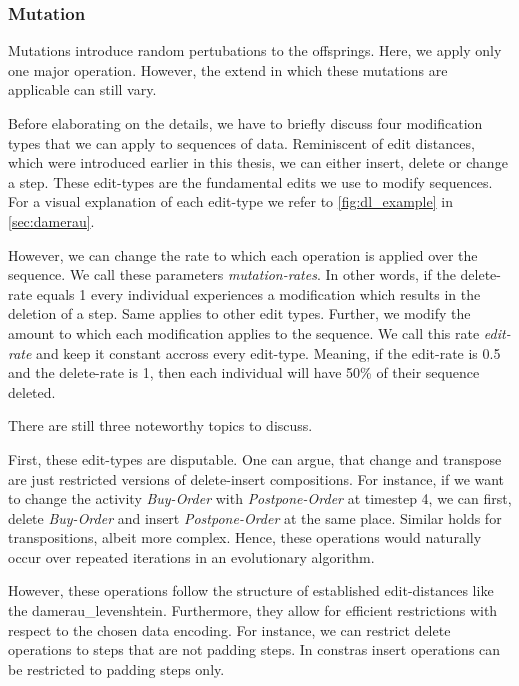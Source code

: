 \documentclass[./../../paper.tex]{subfiles}
\begin{document}

\subsubsection{Mutation}
Mutations introduce random pertubations to the offsprings. Here, we apply only one major operation. However, the extend in which these mutations are applicable can still vary.

Before elaborating on the details, we have to briefly discuss four modification types that we can apply to sequences of data. Reminiscent of edit distances, which were introduced earlier in this thesis, we can either insert, delete or change a step. These edit-types are the fundamental edits we use to modify sequences. For a visual explanation of each edit-type we refer to \autoref{fig:dl_example} in \autoref{sec:damerau}.

However, we can change the rate to which each operation is applied over the sequence. We call these parameters \emph{mutation-rates}. In other words, if the delete-rate equals 1 every individual experiences a modification which results in the deletion of a step. Same applies to other edit types. Further, we modify the amount to which each modification applies to the sequence. We call this rate \emph{edit-rate} and keep it constant accross every edit-type. Meaning, if the edit-rate is 0.5 and the delete-rate is 1, then each individual will have 50\% of their sequence deleted.

\noindent There are still three noteworthy topics to discuss.

First, these edit-types are disputable. One can argue, that change and transpose are just restricted versions of delete-insert compositions. For instance, if we want to change the activity \emph{Buy-Order} with \emph{Postpone-Order} at timestep 4, we can first, delete \emph{Buy-Order} and insert \emph{Postpone-Order} at the same place. Similar holds for transpositions, albeit more complex. Hence, these operations would naturally occur over repeated iterations in an evolutionary algorithm.

However, these operations follow the structure of established edit-distances like the \gls{damerau_levenshtein}. Furthermore, they allow for efficient restrictions with respect to the chosen data encoding. For instance, we can restrict delete operations to steps that are not padding steps. In constras insert operations can be restricted to padding steps only.
\end{document}
